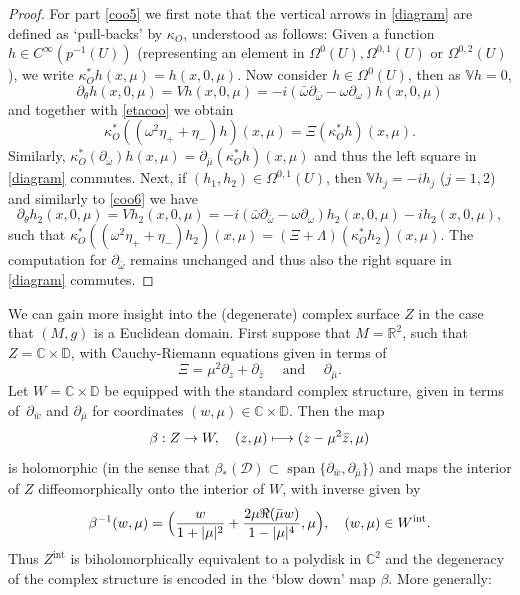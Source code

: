 \documentclass[JEP,XML,SOM,Unicode,published]{cedram}
\newcommand\mto{\mathchoice{\longmapsto}{\mapsto}{\mapsto}{\mapsto}}
\theoremstyle{plain}
\theoremstyle{definition}
\newcommand{\R}{\mathbb{R}}
\newcommand{\C}{\mathbb{C}}
\newcommand{\DD}{\mathbb{D}}
\newcommand{\V}{\mathbb{V}}
\newcommand{\D}{\mathscr{D}}
\newcommand{\interior}{\mathrm{int}}
\DeclareMathOperator{\spn}{span}
\newcommand{\1}{{\bf 1}}
\begin{document}
\begin{proof}
For part \eqref{coo5} we first note that the vertical arrows in \eqref{diagram} are defined as `pull-backs' by $\kappa_O$, understood as follows: Given a function $h\in C^\infty(p^{-1}(U))$ (representing an element in $\Omega^0(U), \Omega^{0,1}(U)$ or $\Omega^{0,2}(U)$), we write
$\kappa_O^* h(x,\mu) = h(x,0,\mu)$. Now consider $h\in \Omega^0(U)$, then as $\V h = 0$,
\begin{equation}\label{coo6}
\partial_\theta h(x,0,\mu) = Vh(x,0,\mu)= -i(\bar \omega \partial_{\bar \omega} - \omega \partial_{\omega})h(x,0,\mu)
\end{equation}
and together with \eqref{etacoo} we obtain
\begin{equation*}
\kappa_O^*\left((\omega^2\eta_++\eta_-) h\right)(x,\mu) = \Xi(\kappa_O^*h)(x,\mu).
\end{equation*}
Similarly, $\kappa_O^*(\partial_{\bar \omega})h(x,\mu)=\partial_{\bar \mu}(\kappa_O^*h)(x,\mu)$ and thus the left square in \eqref{diagram} commutes. Next, if $(h_1,h_2)\in \Omega^{0,1}(U)$, then $\V h_j = -ih_j$ ($j=1,2$) and similarly to \eqref{coo6} we have
\begin{equation*}
\partial_\theta h_2(x,0,\mu) = Vh_2(x,0,\mu)= -i(\bar \omega \partial_{\bar \omega} - \omega \partial_{\omega})h_2(x,0,\mu) - i h_2(x,0,\mu),
\end{equation*}
such that
$
\kappa_O^*\left((\omega^2 \eta_+ + \eta_-)h_2\right)(x,\mu) = (\Xi+ \Lambda)(\kappa_O^* h_2)(x,\mu)
$. The computation for $\partial_{\bar \omega}$ remains unchanged and thus also the right square in \eqref{diagram} commutes.
\end{proof}

We can gain more insight into the (degenerate) complex surface $Z$ in the case that $(M,g)$ is a Euclidean domain. First suppose that $M=\R^2$, such that $Z=\C\times \DD$, with Cauchy-Riemann equations given in terms of
\begin{equation*}
\Xi = \mu^2 \partial_{z} + \partial_{\bar z}\quad \text{ and } \quad \partial_{\bar \mu}.
\end{equation*}
Let $W=\C\times \DD$ be equipped with the standard complex structure, given in terms of~$\partial_{\bar w}$ and $\partial_{\bar \mu}$ for coordinates $(w,\mu)\in \C\times \DD$. Then the map
\begin{equation}\label{beta1}
\beta: Z\to W,\quad (z,\mu) \mto (z-\mu^2\bar z,\mu)
\end{equation}
is holomorphic (in the sense that $\beta_*(\D)\subset \spn \{\partial_{\bar w},\partial_{\bar \mu}\}$) and maps the interior of $Z$ diffeomorphically onto the interior of $W$, with inverse given by
\begin{equation*}
\beta^{-1}(w,\mu)=\Bigl(\frac{w}{1+\vert \mu \vert^2} + \frac{2\mu\Re(\bar \mu w)}{1-\vert \mu \vert^4},\mu\Bigr),\quad (w,\mu)\in W^{\interior}.
\end{equation*}
Thus $Z^{\interior}$ is biholomorphically equivalent to a polydisk in $\C^2$ and the degeneracy of the complex structure is encoded in the `blow down' map $\beta$. More generally:
\end{document}
